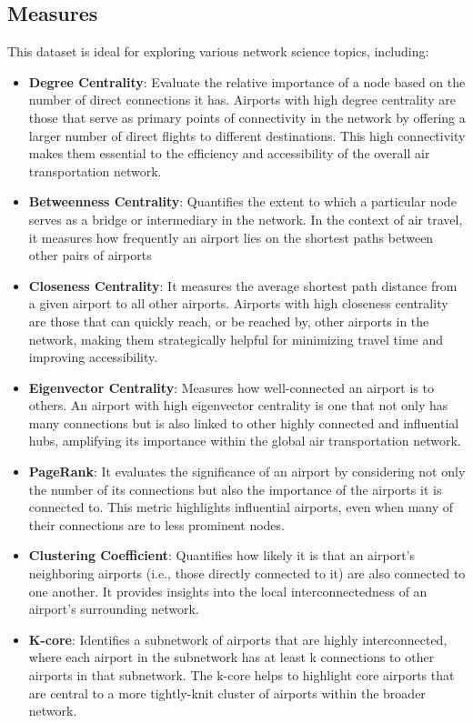 \documentclass[12pt]{article}
\begin{document}
    \subsection{Measures}\label{subsec:measures}
    This dataset is ideal for exploring various network science topics, including:
    \begin{itemize}
        \item \textbf{Degree Centrality}: Evaluate the relative importance of a node based on the number of direct connections it has. Airports with high degree centrality are those that serve as primary points of connectivity in the network by offering a larger number of direct flights to different destinations. This high connectivity makes them essential to the efficiency and accessibility of the overall air transportation network.
        \item \textbf{Betweenness Centrality}: Quantifies the extent to which a particular node serves as a bridge or intermediary in the network. In the context of air travel, it measures how frequently an airport lies on the shortest paths between other pairs of airports
        \item \textbf{Closeness Centrality}: It measures the average shortest path distance from a given airport to all other airports. Airports with high closeness centrality are those that can quickly reach, or be reached by, other airports in the network, making them strategically helpful for minimizing travel time and improving accessibility.
        \item \textbf{Eigenvector Centrality}: Measures how well-connected an airport is to others. An airport with high eigenvector centrality is one that not only has many connections but is also linked to other highly connected and influential hubs, amplifying its importance within the global air transportation network.
        \item \textbf{PageRank}: It evaluates the significance of an airport by considering not only the number of its connections but also the importance of the airports it is connected to. This metric highlights influential airports, even when many of their connections are to less prominent nodes.
        \item \textbf{Clustering Coefficient}: Quantifies how likely it is that an airport's neighboring airports (i.e., those directly connected to it) are also connected to one another. It provides insights into the local interconnectedness of an airport's surrounding network.
        \item \textbf{K-core}: Identifies a subnetwork of airports that are highly interconnected, where each airport in the subnetwork has at least k connections to other airports in that subnetwork. The k-core helps to highlight core airports that are central to a more tightly-knit cluster of airports within the broader network.
    \end{itemize}
\end{document}
